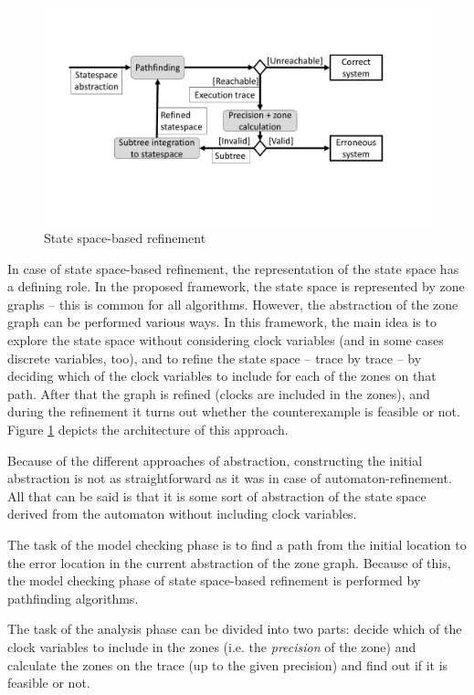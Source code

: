 \begin{figure} 
	\centering
	\includegraphics[width=.7\textwidth]{include/figures/alg_arch_ssp}
	\caption{State space-based refinement}
	\label{fig:cegarssp}
\end{figure}


In case of state space-based refinement, the representation of the state space has a defining role. In the proposed framework, the state space is represented by zone graphs -- this is common for all algorithms. However, the abstraction of the zone graph can be performed various ways. In this framework, the main idea is to explore the state space without considering clock variables (and in some cases discrete variables, too), and to refine the state space -- trace by trace -- by deciding which of the clock variables to include for each of the zones on that path. After that the graph is refined (clocks are included in the zones), and during the refinement it turns out whether the counterexample is feasible or not. Figure \ref{fig:cegarssp} depicts the architecture of this approach.

Because of the different approaches of abstraction, constructing the initial abstraction is not as straightforward as it was in case of automaton-refinement. All that can be said is that it is some sort of abstraction of the state space derived from the automaton without including clock variables.

The task of the model checking phase is to find a path from the initial location to the error location in the current abstraction of the zone graph. Because of this, the model checking phase of state space-based refinement is performed by pathfinding algorithms.

The task of the analysis phase can be divided into two parts:  decide which of the clock variables to include in the zones (i.e. the \emph{precision} of the zone) and calculate the zones on the trace (up to the given precision) and find out if it is feasible or not. 

